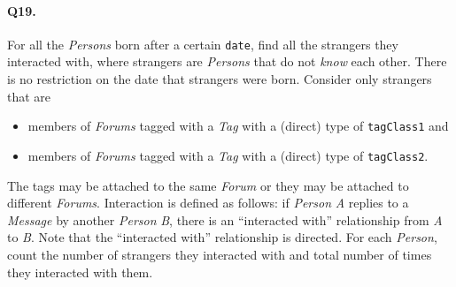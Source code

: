 \paragraph{Q19.}
For all the \emph{Persons} born after a certain \texttt{date}, find all
the strangers they interacted with, where strangers are \emph{Persons}
that do not \emph{know} each other. There is no restriction on the date
that strangers were born.
Consider only strangers that are
\begin{itemize}
\tightlist
\item
  members of \emph{Forums} tagged with a \emph{Tag} with a (direct) type
  of \texttt{tagClass1} and
\item
  members of \emph{Forums} tagged with a \emph{Tag} with a (direct) type
  of \texttt{tagClass2}.
\end{itemize}
The tags may be attached to the same \emph{Forum} or they may be
attached to different \emph{Forums}.
Interaction is defined as follows: if \emph{Person} \emph{A} replies to
a \emph{Message} by another \emph{Person} \emph{B}, there is an
``interacted with'' relationship from \emph{A} to \emph{B}. Note that
the ``interacted with'' relationship is directed.
For each \emph{Person}, count the number of strangers they interacted
with and total number of times they interacted with them.
